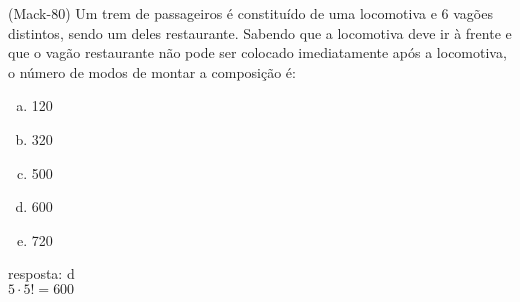 \begin{ex}
 (Mack-80) Um trem de passageiros é constituído de uma locomotiva e 6 vagões distintos, sendo um deles restaurante. Sabendo que a locomotiva deve ir à frente e que o vagão restaurante não pode ser colocado imediatamente após a locomotiva, o número de modos de montar a composição é:
    \begin{enumerate}[(a)]
    \item 120
    \item 320
    \item 500
    \item 600
    \item 720
    \end{enumerate}
      \begin{sol}
       resposta: d \\
       $5\cdot5!=600$
      \end{sol}
\end{ex}